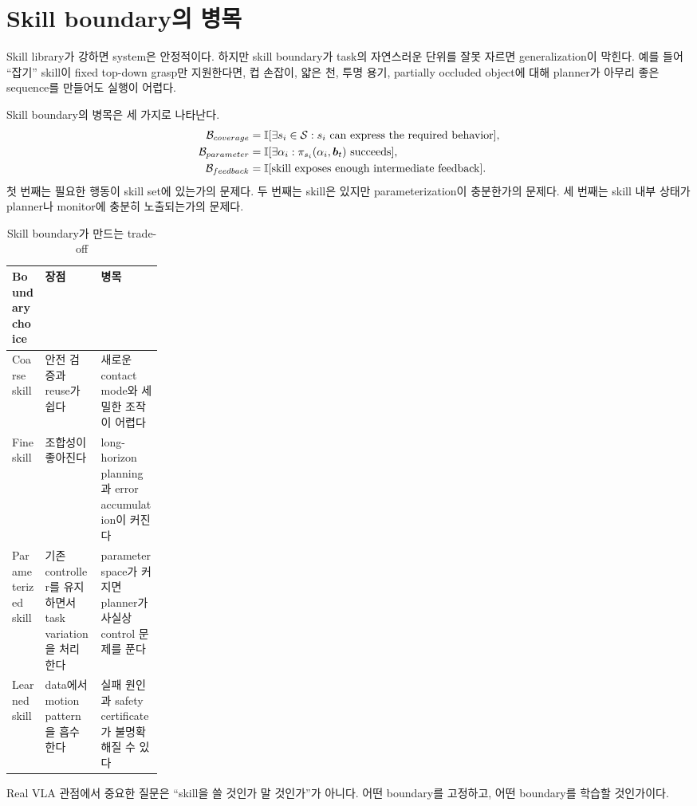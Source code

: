 \section{Skill boundary의 병목}

Skill library가 강하면 system은 안정적이다. 하지만 skill boundary가 task의 자연스러운 단위를 잘못 자르면 generalization이 막힌다. 예를 들어 ``잡기'' skill이 fixed top-down grasp만 지원한다면, 컵 손잡이, 얇은 천, 투명 용기, partially occluded object에 대해 planner가 아무리 좋은 sequence를 만들어도 실행이 어렵다.

Skill boundary의 병목은 세 가지로 나타난다.
\begin{align}
  \mathcal{B}_{coverage}
  &= \mathbb{I}[\exists s_i\in\mathcal{S}: s_i \text{ can express the required behavior}], \\
  \mathcal{B}_{parameter}
  &= \mathbb{I}[\exists \alpha_i: \pi_{s_i}(\alpha_i,\bm{b}_t) \text{ succeeds}], \\
  \mathcal{B}_{feedback}
  &= \mathbb{I}[\text{skill exposes enough intermediate feedback}].
  \label{eq:skill-bottlenecks}
\end{align}
첫 번째는 필요한 행동이 skill set에 있는가의 문제다. 두 번째는 skill은 있지만 parameterization이 충분한가의 문제다. 세 번째는 skill 내부 상태가 planner나 monitor에 충분히 노출되는가의 문제다.

\begin{table}[h]
  \centering
  \caption{Skill boundary가 만드는 trade-off}
  \begin{tabularx}{\linewidth}{p{0.22\linewidth}X X}
    \toprule
    Boundary choice & 장점 & 병목 \\
    \midrule
    Coarse skill & 안전 검증과 reuse가 쉽다 & 새로운 contact mode와 세밀한 조작이 어렵다 \\
    Fine skill & 조합성이 좋아진다 & long-horizon planning과 error accumulation이 커진다 \\
    Parameterized skill & 기존 controller를 유지하면서 task variation을 처리한다 & parameter space가 커지면 planner가 사실상 control 문제를 푼다 \\
    Learned skill & data에서 motion pattern을 흡수한다 & 실패 원인과 safety certificate가 불명확해질 수 있다 \\
    \bottomrule
  \end{tabularx}
  \label{tab:skill-boundary-tradeoff}
\end{table}

Real VLA 관점에서 중요한 질문은 ``skill을 쓸 것인가 말 것인가''가 아니다. 어떤 boundary를 고정하고, 어떤 boundary를 학습할 것인가이다.

